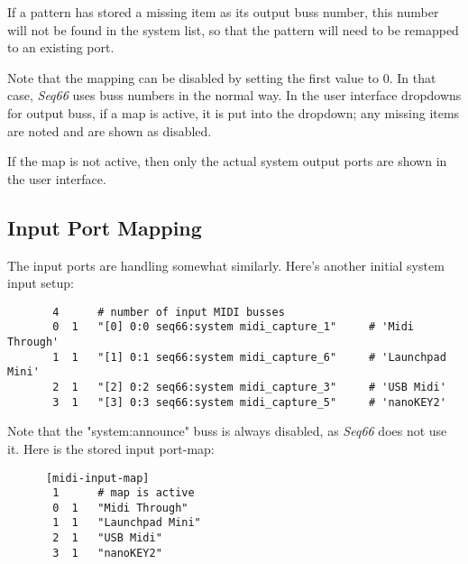    If a pattern has stored a missing item as its output
   buss number, this number will not be found in the system list, so that the
   pattern will need to be remapped to an existing port.

   Note that the mapping can be disabled by setting the first value to 0.  In
   that case, \textsl{Seq66} uses buss numbers in the normal way.
   In the user interface dropdowns for output buss, if a map is active, it is
   put into the dropdown; any missing items are noted and are shown as
   disabled.


   If the map is not active, then only the actual system output ports are
   shown in the user interface.

\subsection{Input Port Mapping}
\label{subsec:input_port_mapping}

   The input ports are handling somewhat similarly.  Here's another
   initial system input setup:

   \begin{verbatim}
       4      # number of input MIDI busses
       0  1   "[0] 0:0 seq66:system midi_capture_1"     # 'Midi Through'
       1  1   "[1] 0:1 seq66:system midi_capture_6"     # 'Launchpad Mini'
       2  1   "[2] 0:2 seq66:system midi_capture_3"     # 'USB Midi'
       3  1   "[3] 0:3 seq66:system midi_capture_5"     # 'nanoKEY2'
   \end{verbatim}

   Note that the "system:announce" buss is always disabled, as \textsl{Seq66}
   does not use it.  Here is the stored input port-map:

   \begin{verbatim}
      [midi-input-map]
       1      # map is active
       0  1   "Midi Through"
       1  1   "Launchpad Mini"
       2  1   "USB Midi"
       3  1   "nanoKEY2"
   \end{verbatim}

